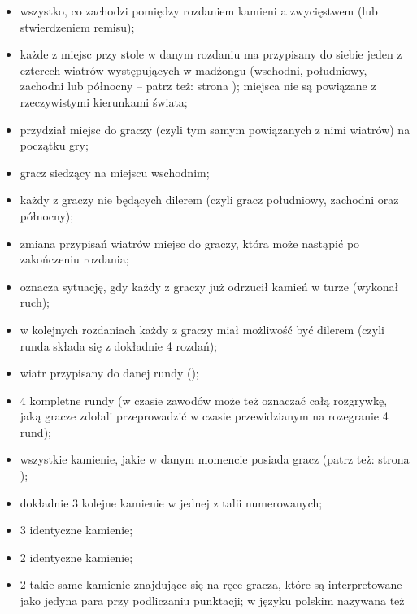 \begin{itemize}
\item {}
wszystko, co zachodzi pomiędzy rozdaniem kamieni
a zwycięstwem (lub stwierdzeniem remisu);
\item {}
każde z miejsc przy stole w danym rozdaniu ma przypisany do siebie jeden z
czterech wiatrów występujących w madżongu (wschodni, południowy, zachodni lub
północny -- patrz też: strona \pageref{wiatry}); miejsca nie są powiązane z
rzeczywistymi kierunkami świata;
\item {}
przydział miejsc do graczy (czyli tym samym powiązanych z nimi wiatrów) na
początku gry;
\item {}
gracz siedzący na miejscu wschodnim;
\item {}
każdy z graczy nie będących dilerem (czyli gracz południowy, zachodni oraz
północny);
\item {}
zmiana przypisań wiatrów miejsc do graczy, która może nastąpić po zakończeniu
rozdania;
  \item {}
  oznacza sytuację, gdy każdy z graczy już odrzucił
  kamień w turze (wykonał ruch);
\item {}
w kolejnych rozdaniach każdy z graczy miał
możliwość być dilerem (czyli runda składa się z dokładnie 4 rozdań);
\item {}
wiatr przypisany do danej rundy (\wiatry);
\item {}
4 kompletne rundy (w czasie zawodów może
też oznaczać całą rozgrywkę, jaką gracze zdołali przeprowadzić w czasie
przewidzianym na rozegranie 4 rund);
\item {}	%
wszystkie kamienie, jakie w danym momencie posiada gracz (patrz też: strona
\pageref{reka});
\item {}
dokładnie 3 kolejne kamienie w jednej z talii numerowanych;
\item {}
3 identyczne kamienie;
\item {}
2 identyczne kamienie;
\item {}
2 takie same kamienie znajdujące się na ręce gracza, które są interpretowane 
jako jedyna para przy podliczaniu punktacji; w języku polskim nazywana też

\end{itemize}
